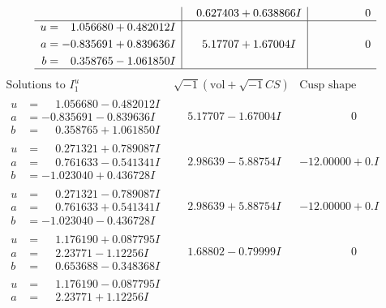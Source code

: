 \documentclass[1p]{elsarticle_modified}
\theoremstyle{definition}
\newcommand{\I}{\sqrt{-1}}
\begin{document}
$$\begin{array}{c|c|c}
 & \phantom{-}0.627403 + 0.638866 I & \phantom{-0.000000 } 0 \\ \hline\begin{aligned}
u &= \phantom{-}1.056680 + 0.482012 I \\
a &= -0.835691 + 0.839636 I \\
b &= \phantom{-}0.358765 - 1.061850 I\end{aligned}
 & \phantom{-}5.17707 + 1.67004 I & \phantom{-0.000000 } 0\\
 \hline 
 \end{array}$$\newpage$$\begin{array}{c|c|c}  
\text{Solutions to }I^u_{1}& \I (\text{vol} + \sqrt{-1}CS) & \text{Cusp shape}\\
 \hline 
\begin{aligned}
u &= \phantom{-}1.056680 - 0.482012 I \\
a &= -0.835691 - 0.839636 I \\
b &= \phantom{-}0.358765 + 1.061850 I\end{aligned}
 & \phantom{-}5.17707 - 1.67004 I & \phantom{-0.000000 } 0 \\ \hline\begin{aligned}
u &= \phantom{-}0.271321 + 0.789087 I \\
a &= \phantom{-}0.761633 - 0.541341 I \\
b &= -1.023040 + 0.436728 I\end{aligned}
 & \phantom{-}2.98639 - 5.88754 I & -12.00000 + 0. I\phantom{ +0.000000I} \\ \hline\begin{aligned}
u &= \phantom{-}0.271321 - 0.789087 I \\
a &= \phantom{-}0.761633 + 0.541341 I \\
b &= -1.023040 - 0.436728 I\end{aligned}
 & \phantom{-}2.98639 + 5.88754 I & -12.00000 + 0. I\phantom{ +0.000000I} \\ \hline\begin{aligned}
u &= \phantom{-}1.176190 + 0.087795 I \\
a &= \phantom{-}2.23771 - 1.12256 I \\
b &= \phantom{-}0.653688 - 0.348368 I\end{aligned}
 & \phantom{-}1.68802 - 0.79999 I & \phantom{-0.000000 } 0 \\ \hline\begin{aligned}
u &= \phantom{-}1.176190 - 0.087795 I \\
a &= \phantom{-}2.23771 + 1.12256 I \\

\end{aligned}
\end{array}$$
\end{document}
